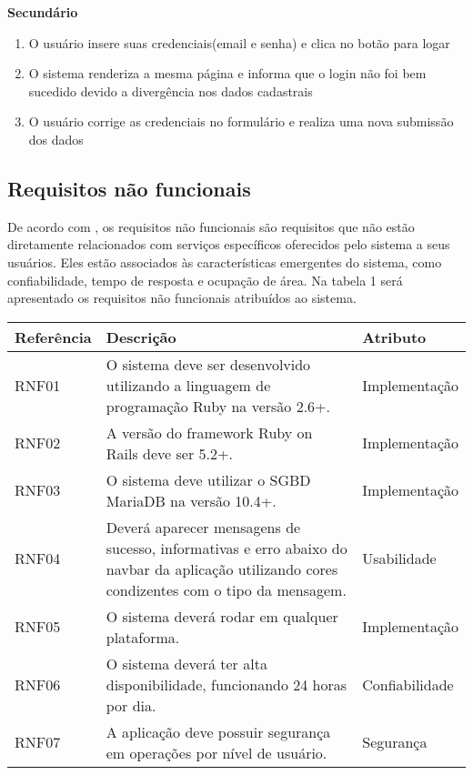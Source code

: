 \textbf{Secundário}

\begin{enumerate}
  \item O usuário insere suas credenciais(email e senha) e clica no botão para logar
  \item O sistema renderiza a mesma página e informa que o login não foi bem sucedido devido a divergência nos dados cadastrais
  \item O usuário corrige as credenciais no formulário e realiza uma nova submissão dos dados
\end{enumerate}

\subsection{Requisitos não funcionais}
De acordo com \cite{sommerville2007engenharia}, os requisitos não funcionais são requisitos que não estão diretamente relacionados com serviços específicos oferecidos pelo sistema a seus usuários. Eles estão associados às características emergentes do sistema, como confiabilidade, tempo de resposta e ocupação de área. Na tabela 1 será apresentado os requisitos não funcionais atribuídos ao sistema.

\begin{tabularx}{0.9\textwidth} { 
  | >{\raggedright\arraybackslash}X 
  | >{\raggedright\arraybackslash}X 
  | >{\raggedright\arraybackslash}X | }
 \hline
 Referência & Descrição & Atributo \\
 \hline
 RNF01 & O sistema deve ser desenvolvido utilizando a linguagem de programação Ruby na versão 2.6+. & Implementação  \\
 \hline
 RNF02 & A versão do framework Ruby on Rails deve ser 5.2+. & Implementação  \\
 \hline
 RNF03 & O sistema deve utilizar o SGBD MariaDB na versão 10.4+. & Implementação  \\
 \hline
 RNF04 & Deverá aparecer mensagens de sucesso, informativas e erro abaixo do navbar da aplicação utilizando cores condizentes com o tipo da mensagem. & Usabilidade  \\
 \hline
 RNF05 & O sistema deverá rodar em qualquer plataforma. & Implementação  \\
 \hline
 RNF06 & O sistema deverá ter alta disponibilidade, funcionando 24 horas por dia. & Confiabilidade  \\
 \hline
 RNF07 & A aplicação deve possuir segurança em operações por nível de usuário. & Segurança  \\
 \hline
\end{tabularx}

